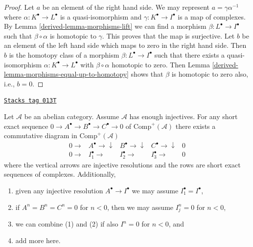 \begin{proof}

Let $a$ be an element of the right hand side.
We may represent $a = \gamma\alpha^{-1}$ where
$\alpha : K^\bullet \to L^\bullet$
is a quasi-isomorphism and $\gamma : K^\bullet \to I^\bullet$ is a map
of complexes. By
Lemma \ref{derived-lemma-morphisms-lift}
we can find a morphism $\beta : L^\bullet \to I^\bullet$ such that
$\beta \circ \alpha$ is homotopic to $\gamma$. This proves that the
map is surjective. Let $b$ be an element of the left hand side
which maps to zero in the right hand side. Then $b$ is the homotopy class
of a morphism $\beta : L^\bullet \to I^\bullet$ such that there exists a
quasi-isomorphism $\alpha : K^\bullet \to L^\bullet$ with
$\beta  \circ \alpha$ homotopic to zero. Then
Lemma \ref{derived-lemma-morphisms-equal-up-to-homotopy}
shows that $\beta$ is homotopic to zero also, i.e., $b = 0$.
\end{proof}

\begin{lemma}
\label{derived-lemma-injective-resolution-ses}
\href{https://stacks.math.columbia.edu/tag/013T}{\texttt{Stacks tag 013T}}

Let $\mathcal{A}$ be an abelian category.
Assume $\mathcal{A}$ has enough injectives.
For any short exact sequence
$0 \to A^\bullet \to B^\bullet \to C^\bullet \to 0$
of $\text{Comp}^{+}(\mathcal{A})$ there exists a
commutative diagram in $\text{Comp}^{+}(\mathcal{A})$
$$
\begin{array}{ccccc}0 \longrightarrow & A^\bullet \longrightarrow\downarrow & B^\bullet \longrightarrow\downarrow & C^\bullet \longrightarrow\downarrow & 0 \\ 0 \longrightarrow & I_1^\bullet \longrightarrow & I_2^\bullet \longrightarrow & I_3^\bullet \longrightarrow & 0\end{array}
$$
where the vertical arrows are injective resolutions and
the rows are short exact sequences of complexes. Additionally,
\begin{enumerate}
\item given any injective resolution $A^\bullet \to I^\bullet$
we may assume $I_1^\bullet = I^\bullet$,
\item if $A^n = B^n = C^n = 0$ for $n < 0$, then we may
assume $I_j^n = 0$ for $n < 0$,
\item we can combine (1) and (2) if also $I^n = 0$ for $n < 0$, and
\item add more here.
\end{enumerate}
\end{lemma}

